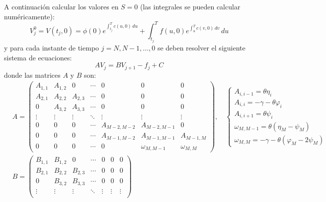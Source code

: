 A continuación calcular los valores en $S=0$ (las integrales se pueden calcular numéricamente):
\begin{equation*}
    \boxed{V_j^0 = V(t_j, 0) = \phi(0) e^{\int_{t_j}^T c(u, 0)\,du} + \int_{t_j}^T f(u, 0) e^{\int_u^T c(v, 0)\,dv}\,du}
\end{equation*}
y para cada instante de tiempo $j=N, N-1, \ldots, 0$ se deben resolver el siguiente sistema de ecuaciones:
\begin{equation*}
    \boxed{A V_j = B V_{j+1} - f_j + C}
\end{equation*}
donde las matrices $A$ y $B$ son:
\begin{align*}
    &\boxed{
        A = \begin{pmatrix}
            A_{1,1} & A_{1,2} & 0 & \cdots & 0 & 0 & 0 \\
            A_{2,1} & A_{2,2} & A_{2,3} & \cdots & 0 & 0 & 0 \\
            0 & A_{3,2} & A_{3,3} & \cdots & 0 & 0 & 0 \\
            \vdots & \vdots & \vdots & \ddots & \vdots & \vdots & \vdots \\
            0 & 0 & 0 & \cdots & A_{M-2,M-2} & A_{M-2,M-1} & 0 \\
            0 & 0 & 0 & \cdots & A_{M-1,M-2} & A_{M-1,M-1} & A_{M-1,M} \\
            0 & 0 & 0 & \cdots & 0  & \omega_{M,M-1} & \omega_{M,M}
        \end{pmatrix},
        \quad \begin{cases}
            A_{i,i-1} = \theta\eta_i \\
            A_{i,i} = -\gamma - \theta \varphi_i \\
            A_{i,i+1} = \theta\psi_i \\
            \omega_{M,M-1} = \theta(\eta_M - \psi_M) \\
            \omega_{M,M} = -\gamma - \theta (\varphi_M - 2\psi_M)
        \end{cases}
    } \\
    & \boxed{
        B = \begin{pmatrix}
            B_{1,1} & B_{1,2} & 0 & \cdots & 0 & 0 & 0 \\
            B_{2,1} & B_{2,2} & B_{2,3} & \cdots & 0 & 0 & 0 \\
            0 & B_{3,2} & B_{3,3} & \cdots & 0 & 0 & 0 \\
            \vdots & \vdots & \vdots & \ddots & \vdots & \vdots & \vdots \\

\end{pmatrix}}
\end{align*}

